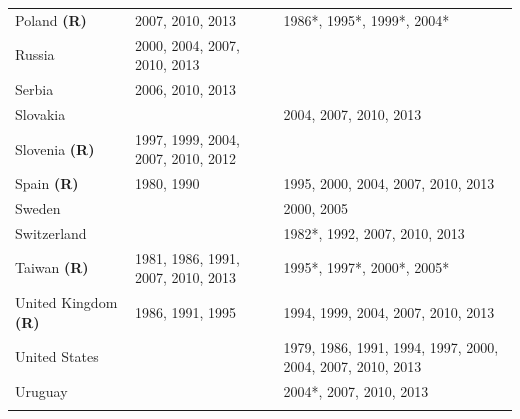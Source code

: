 \begin{tabularx}{\textwidth}{lXX}
Poland \textbf{(R)}         & 2007, 2010, 2013                               & 1986*, 1995*, 1999*, 2004*                                    \\
Russia             & 2000, 2004, 2007, 2010, 2013                   &                                                               \\
Serbia             & 2006, 2010, 2013                               &                                                               \\
Slovakia           &                                                & 2004, 2007, 2010, 2013                                        \\
Slovenia \textbf{(R)}       & 1997, 1999, 2004, 2007, 2010, 2012             &                                                               \\
Spain \textbf{(R)}          & 1980, 1990                                     & 1995, 2000, 2004, 2007, 2010, 2013                            \\
Sweden             &                                                & 2000, 2005                                                    \\
Switzerland        &                                                & 1982*, 1992, 2007, 2010, 2013                                 \\
Taiwan \textbf{(R)}         & 1981, 1986, 1991, 2007, 2010, 2013             & 1995*, 1997*, 2000*, 2005*                                    \\
United Kingdom \textbf{(R)} & 1986, 1991, 1995                               & 1994, 1999, 2004, 2007, 2010, 2013                            \\
United States      &                                                & 1979, 1986, 1991, 1994, 1997, 2000, 2004, 2007, 2010, 2013    \\
Uruguay            &                                                & 2004*, 2007, 2010, 2013                                       \\ \hline
    \label{tab:datasets}
    
\end{tabularx}

